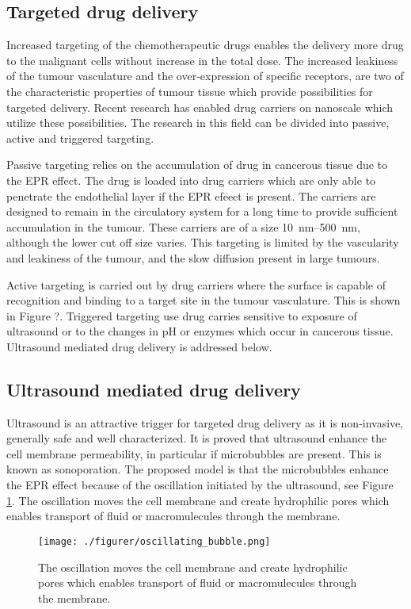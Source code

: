 \subsection{Targeted drug delivery}
Increased targeting of the chemotherapeutic drugs enables the delivery more drug to the malignant cells without increase in the total dose.  The increased leakiness of the tumour vasculature and the over-expression of specific receptors, are two of the characteristic properties of tumour tissue which provide possibilities for targeted delivery. Recent research has enabled drug carriers on nanoscale which utilize these possibilities\cite{Jafari}. The research in this field can be divided into passive, active and triggered targeting. 



Passive targeting relies on the accumulation of drug in cancerous tissue due to the EPR effect. The drug is loaded into drug carriers which are only able to penetrate the endothelial layer if the EPR efeect is present\cite{Andresen2010}. The carriers are designed to remain in the circulatory system for a long time to provide sufficient accumulation in the tumour. These carriers are of a size \SIrange{10}{500}{\nano\meter}, although the lower cut off size varies\cite{Hofmann}. This targeting is limited by the vascularity and leakiness of the tumour, and the slow diffusion present in large tumours.

Active targeting is carried out by drug carriers where the surface is capable of recognition and binding to a target site in the tumour vasculature. This is shown in Figure ?. Triggered targeting use drug carries sensitive to exposure of ultrasound or to the changes in pH or enzymes which occur in cancerous tissue. Ultrasound mediated drug delivery is addressed below.

\subsection{Ultrasound mediated drug delivery}
Ultrasound is an attractive trigger for targeted drug delivery as it is non-invasive, generally safe and well characterized. It is proved that ultrasound enhance the cell membrane permeability, in particular if microbubbles are present\cite{VanWamel2006a}. This is known as sonoporation. The proposed model is that the microbubbles enhance the EPR effect because of the oscillation initiated by the ultrasound, see Figure \ref{Fig:oscillating_bubble}. The oscillation moves the cell membrane and create hydrophilic pores which enables transport of fluid or macromulecules through the membrane\cite{VanWamel2006a}.
\begin{figure}[h]
  \centering
  \label{Fig:oscillating_bubble}
  \texttt{[image: ./figurer/oscillating\_bubble.png]}
  \caption{The oscillation moves the cell membrane and create hydrophilic pores which enables transport of fluid or macromulecules through the membrane\cite{VanWamel2006a}.}
\end{figure}

